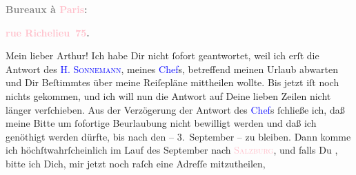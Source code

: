            \pstart
           \begin{otherlanguage}{french}\textcolor{gray}{\textbf{\textbf{Bureaux à \textcolor{pink}{Paris}{}\ledrightnote{\textcolor{pink}{Paris}}:}}}\end{otherlanguage}\pend
           \pstart
           \begin{otherlanguage}{french}\textcolor{gray}{\textbf{\textbf{\textcolor{pink}{rue Richelieu 75}{}\ledrightnote{\textcolor{pink}{rue Richelieu}}.}}}\end{otherlanguage}\pend
           \pstart\center{}Mein lieber Arthur!\pend\pstart
           Ich habe Dir nicht ſofort geantwortet, weil ich erſt die Antwort des \textcolor{blue}{H. \textsc{Sonnemann}}{}\ledrightnote{\textcolor{blue}{Leopold Sonnemann}}, meines \textcolor{blue}{Chef}{}s,
               betreffend meinen Urlaub abwarten und Dir Beſtimmtes über meine Reiſepläne mittheilen
               wollte. Bis jetzt iſt noch nichts gekommen, und ich will nun die Antwort auf Deine
               lieben Zeilen nicht länger verſchieben. Aus der Verzögerung der Antwort des \textcolor{blue}{Chef}{}s ſchließe ich, daß meine
               Bitte um ſofortige Beurlaubung nicht bewilligt werden und daß ich genöthigt werden
               dürfte, bis nach den \label{K_L02712-1v}\label{K_L02712-1h}{ }{\pb} – 3. September – zu
               bleiben. Dann komme ich höchſtwahrſcheinlich im Lauf des September nach \textsc{\textcolor{pink}{Salzburg}{}\ledrightnote{\textcolor{pink}{Salzburg}}}, und falls Du \label{K_L02712-2v}\label{K_L02712-2h}, bitte ich Dich, mir jetzt noch raſch eine Adreſſe mitzutheilen,
